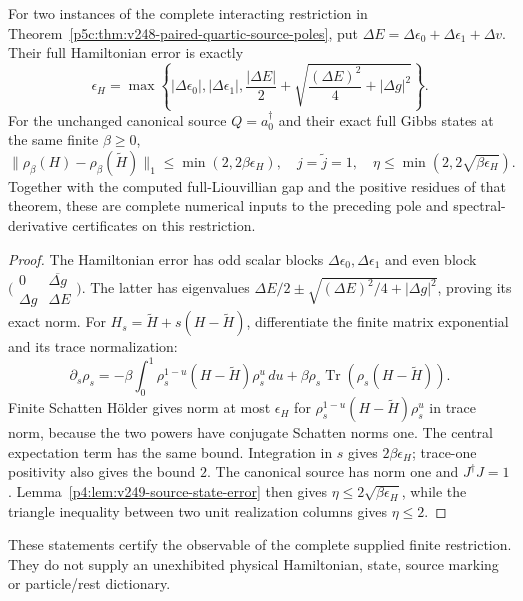 \documentclass[12pt,a4paper]{article}
\begin{document}
\begin{corollary}
\label{p4:cor:v249-paired-coefficient-certification}
For two instances of the complete interacting restriction in
Theorem~\ref{p5c:thm:v248-paired-quartic-source-poles}, put
$\Delta E=\Delta\epsilon_0+\Delta\epsilon_1+\Delta v$.
Their full Hamiltonian error is exactly
\[
 \boxed{\epsilon_H=
 \max\left\{|\Delta\epsilon_0|,|\Delta\epsilon_1|,
 \frac{|\Delta E|}{2}
 +\sqrt{\frac{(\Delta E)^2}{4}+|\Delta g|^2}\right\}.}
\]
For the unchanged canonical source $Q=a_0^\dagger$ and their exact
full Gibbs states at the same finite $\beta\ge0$,
\[
 \boxed{\|\rho_\beta(H)-\rho_\beta(\widetilde H)\|_1
 \le\min(2,2\beta\epsilon_H),\quad
 j=\widetilde j=1,\quad
 \eta\le\min(2,2\sqrt{\beta\epsilon_H}).}
\]
Together with the computed full-Liouvillian gap and the positive
residues of that theorem, these are complete numerical inputs to the
preceding pole and spectral-derivative certificates on this restriction.
\end{corollary}
\begin{proof}
The Hamiltonian error has odd scalar blocks
$\Delta\epsilon_0,\Delta\epsilon_1$ and even block
$\bigl(\begin{smallmatrix}0&\overline{\Delta g}\\
 \Delta g&\Delta E\end{smallmatrix}\bigr)$.
The latter has eigenvalues $\Delta E/2\pm
\sqrt{(\Delta E)^2/4+|\Delta g|^2}$, proving its exact norm.
For $H_s=\widetilde H+s(H-\widetilde H)$, differentiate the finite
matrix exponential and its trace normalization:
\[
 \partial_s\rho_s=-\beta\int_0^1
 \rho_s^{1-u}(H-\widetilde H)\rho_s^u\,du
 +\beta\rho_s\operatorname{Tr}(\rho_s(H-\widetilde H)).
\]
Finite Schatten H\"older gives norm at most $\epsilon_H$ for
$\rho_s^{1-u}(H-\widetilde H)\rho_s^u$ in trace norm,
because the two powers have conjugate Schatten norms one. The
central expectation term has the same bound. Integration in $s$
gives $2\beta\epsilon_H$; trace-one positivity also gives the bound
$2$. The canonical source has norm one and $J^\dagger J=1$.
Lemma~\ref{p4:lem:v249-source-state-error} then gives
$\eta\le2\sqrt{\beta\epsilon_H}$, while the triangle inequality
between two unit realization columns gives $\eta\le2$.
\end{proof}
These statements certify the observable of the complete supplied finite
restriction. They do not supply an unexhibited physical Hamiltonian,
state, source marking or particle/rest dictionary.
\end{document}
